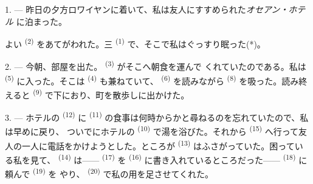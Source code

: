 %
%


\VUsaut{3.0mm}
\VUsaut{1.6mm}
\VUsaut{2.0mm}
\VUsaut{3.4mm}

1. --- 昨日の夕方ロワイヤンに着いて、私は友人にすすめられた\textit{オセアン・ホテル}
に泊まった。

よい \textsuperscript{(2)} をあてがわれた。三
\textsuperscript{(1)} で、そこで私はぐっすり眠った(*)。

2. --- 今朝、部屋を出た。 \textsuperscript{(3)} がそこへ朝食を運んで
くれていたのである。私は \textsuperscript{(5)} に入った。そこは
 \textsuperscript{(4)} も兼ねていて、 \textsuperscript{(6)}
を読みながら \textsuperscript{(8)} を吸った。読み終えると
 \textsuperscript{(9)} で下におり、町を散歩しに出かけた。

3. --- ホテルの \textsuperscript{(12)} に
\textsuperscript{(11)} の食事は何時からかと尋ねるのを忘れていたので、私は早めに戻り、
ついでにホテルの \textsuperscript{(10)} で湯を浴びた。それから
 \textsuperscript{(15)} へ行って友人の一人に電話をかけようとした。ところが
 \textsuperscript{(13)} はふさがっていた。困っている私を見て、
 \textsuperscript{(14)} は—— \textsuperscript{(17)} を
 \textsuperscript{(16)} に書き入れているところだった——
 \textsuperscript{(18)} に頼んで \textsuperscript{(19)} を
やり、 \textsuperscript{(20)} で私の用を足させてくれた。

